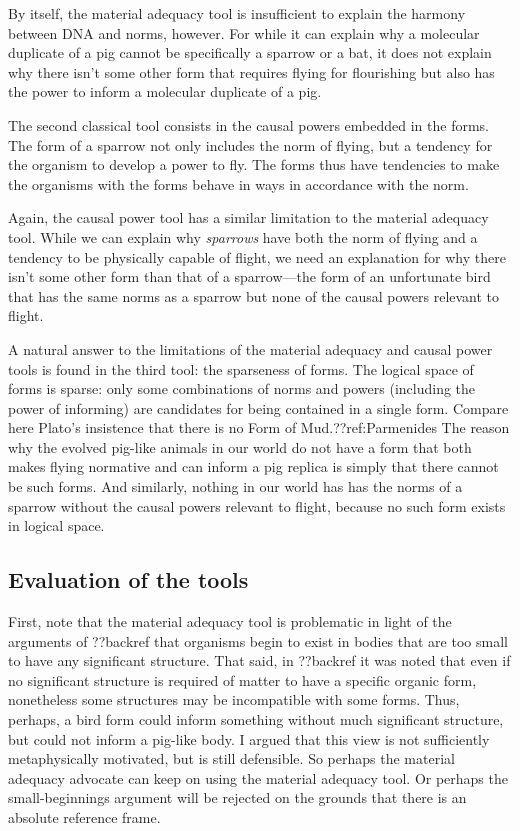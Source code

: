 By itself, the material adequacy tool is insufficient to explain the harmony between DNA and norms, however. For while 
it can explain why a molecular duplicate of a pig cannot be specifically a sparrow or a bat, it does not explain why there 
isn't some other form that requires flying for flourishing but also has the power to inform a molecular duplicate of a pig.

The second classical tool consists in the causal powers embedded in the forms. The form of a sparrow not only includes the 
norm of flying, but a tendency for the organism to develop a power to fly. The forms thus have tendencies to make the organisms
with the forms behave in ways in accordance with the norm.

Again, the causal power tool has a similar limitation to the material adequacy tool. While we can explain why \textit{sparrows}
have both the norm of flying and a tendency to be physically capable of flight, we need an explanation for why there isn't some 
other form than that of a sparrow---the form of an unfortunate bird that has the same norms as a sparrow but none of the causal 
powers relevant to flight. 

A natural answer to the limitations of the material adequacy and causal power tools is found in the third tool: the sparseness 
of forms. The logical space of forms is sparse: only some combinations of norms and powers (including 
the power of informing) are candidates for being contained in a single form. Compare here Plato's insistence that there is 
no Form of Mud.??ref:Parmenides The reason why the evolved pig-like animals in our world do not have a form that both makes 
flying normative and can inform a pig replica is simply that there cannot be such forms. And similarly, nothing in our world 
has has the norms of a sparrow without the causal powers relevant to flight, because no such form exists in logical space.

\subsection{Evaluation of the tools}\label{sec:eval}
First, note that the material adequacy tool is problematic in light of the arguments of ??backref that organisms begin 
to exist in bodies that are too small to have any significant structure. That said, in ??backref it was noted that even 
if no significant structure is required of matter to have a specific organic form, nonetheless some structures may be 
incompatible with some forms. Thus, perhaps, a bird form could inform something without much significant structure, but 
could not inform a pig-like body. I argued that this view is not sufficiently metaphysically motivated, but is still
defensible. So perhaps the material adequacy advocate can keep on using the material adequacy tool. Or perhaps the
small-beginnings argument will be rejected on the grounds that there is an absolute reference frame.

